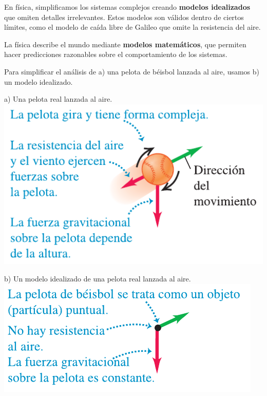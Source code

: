 \documentclass{article}
\newcommand{\bl}[1]{\textbf{#1}}
\begin{document}
    \begin{multicols}{2}

    \begin{center}
    \begin{minipage}[t]{0.60\textwidth}
    
        \smallskip

        \par En física, simplificamos los sistemas complejos creando \bl{modelos idealizados} que omiten detalles irrelevantes. Estos modelos son válidos dentro de ciertos límites, como el modelo de caída libre de Galileo que omite la resistencia del aire.
        \par La física describe el mundo mediante \bl{modelos matemáticos}, que permiten hacer predicciones razonables sobre el comportamiento de los sistemas.

    \end{minipage}

    \hfill
    \columnbreak
    
    \begin{minipage}[t]{0.25\textwidth}

        \bigskip
        \par Para simplificar el análisis de a) una pelota de béisbol lanzada al aire, usamos b) un modelo idealizado.
        \smallskip
        \par a) Una pelota real lanzada al aire.
        \includegraphics[width=\linewidth]{img/1.1-1.png}

        \par b) Un modelo idealizado de una pelota real lanzada al aire.
        \includegraphics[width=\linewidth]{img/1.1-2.png}

    \end{minipage}
    \end{center}

    \end{multicols}
\end{document}
